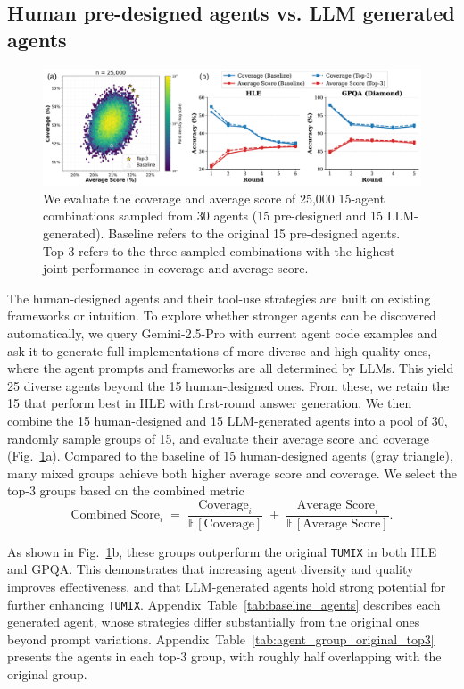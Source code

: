 \subsection{Human pre-designed agents vs. LLM generated agents}
\label{sec:Human pre-designed agents vs. LLM generated agents}
\begin{figure}[ht]
  \centering
  \includegraphics[width=0.95\linewidth]{Figures/LLM_generated_agents.pdf}
   \caption{We evaluate the coverage and average score of 25,000 15-agent combinations sampled from 30 agents (15 pre-designed and 15 LLM-generated). Baseline refers to the original 15 pre-designed agents. Top-3 refers to the three sampled combinations with the highest joint performance in coverage and average score.}
   \label{fig:LLM_generated_agents}
\end{figure}

The human-designed agents and their tool-use strategies are built on existing frameworks or intuition. To explore whether stronger agents can be discovered automatically, we query Gemini-2.5-Pro with current agent code examples and ask it to generate full implementations of more diverse and high-quality ones, where the agent prompts and frameworks are all determined by LLMs. This yield 25 diverse agents beyond the 15 human-designed ones. From these, we retain the 15 that perform best in HLE with first-round answer generation. We then combine the 15 human-designed and 15 LLM-generated agents into a pool of 30, randomly sample groups of 15, and evaluate their average score and coverage (Fig.~\ref{fig:LLM_generated_agents}a). Compared to the baseline of 15 human-designed agents (gray triangle), many mixed groups achieve both higher average score and coverage. We select the top-3 groups based on the combined metric
\begin{equation}
\label{eq:combined_score}
\text{Combined Score}_i \;=\; 
\frac{\text{Coverage}_i}{\mathbb{E}\!\left[\text{Coverage}\right]} 
\;+\; 
\frac{\text{Average Score}_i}{\mathbb{E}\!\left[\text{Average Score}\right]}.
\end{equation}

As shown in Fig.~\ref{fig:LLM_generated_agents}b, these groups outperform the original \texttt{TUMIX} in both HLE and GPQA. This demonstrates that increasing agent diversity and quality improves effectiveness, and that LLM-generated agents hold strong potential for further enhancing \texttt{TUMIX}. Appendix~Table~\ref{tab:baseline_agents} describes each generated agent, whose strategies differ substantially from the original ones beyond prompt variations. Appendix~Table~\ref{tab:agent_group_original_top3} presents the agents in each top-3 group, with roughly half overlapping with the original group.

